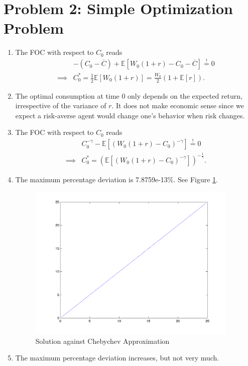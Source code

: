 \section*{Problem 2: Simple Optimization Problem}
\begin{enumerate}
\item
The FOC with respect to $C_0$ reads
\begin{align}
	&-(C_0-\overline C)+\mathbb E[W_0(1+r)-C_0-\overline C]\overset{!}{=}0\\
	\implies&C_0^*=\frac{1}{2}\mathbb E[W_0(1+r)]
	=\frac{W_0}{2}(1+\mathbb E[r]).
\end{align}

\item
The optimal consumption at time 0 only depends on the expected return, irrespective of the variance of $r$. It does not make economic sense since we expect a risk-averse agent would change one's behavior when risk changes.

\item
The FOC with respect to $C_0$ reads
\begin{align}
	&C_0^{-\gamma}-\mathbb E[(W_0(1+r)-C_0)^{-\gamma}]\overset{!}{=}0\\
	\implies&C_0^*=\left(\mathbb E[(W_0(1+r)-C_0)^{-\gamma}]\right)^{-\frac{1}{\gamma}}.
\end{align}

\item
The maximum percentage deviation is 7.8759e-13\%. See Figure \ref{Q2}.
\begin{figure}[htbp]
\begin{center}
	\includegraphics[width=10cm]{Figure/Q2.png}	
\caption{Solution against Chebychev Approximation}
\label{Q2}
\end{center}
\end{figure}

\item
The maximum percentage deviation increases, but not very much.
\end{enumerate}

